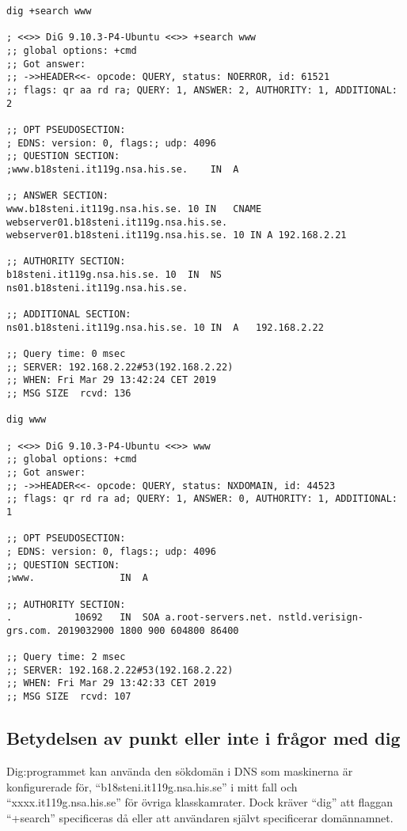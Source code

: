 \documentclass[11pt,a4paper]{article}
\begin{document}
\begin{lstlisting}[caption={Några frågor, 'dig -t A www' med eller utan '+search'}]
dig +search www

; <<>> DiG 9.10.3-P4-Ubuntu <<>> +search www
;; global options: +cmd
;; Got answer:
;; ->>HEADER<<- opcode: QUERY, status: NOERROR, id: 61521
;; flags: qr aa rd ra; QUERY: 1, ANSWER: 2, AUTHORITY: 1, ADDITIONAL: 2

;; OPT PSEUDOSECTION:
; EDNS: version: 0, flags:; udp: 4096
;; QUESTION SECTION:
;www.b18steni.it119g.nsa.his.se.	IN	A

;; ANSWER SECTION:
www.b18steni.it119g.nsa.his.se.	10 IN	CNAME	webserver01.b18steni.it119g.nsa.his.se.
webserver01.b18steni.it119g.nsa.his.se.	10 IN A	192.168.2.21

;; AUTHORITY SECTION:
b18steni.it119g.nsa.his.se. 10	IN	NS	ns01.b18steni.it119g.nsa.his.se.

;; ADDITIONAL SECTION:
ns01.b18steni.it119g.nsa.his.se. 10 IN	A	192.168.2.22

;; Query time: 0 msec
;; SERVER: 192.168.2.22#53(192.168.2.22)
;; WHEN: Fri Mar 29 13:42:24 CET 2019
;; MSG SIZE  rcvd: 136

dig www

; <<>> DiG 9.10.3-P4-Ubuntu <<>> www
;; global options: +cmd
;; Got answer:
;; ->>HEADER<<- opcode: QUERY, status: NXDOMAIN, id: 44523
;; flags: qr rd ra ad; QUERY: 1, ANSWER: 0, AUTHORITY: 1, ADDITIONAL: 1

;; OPT PSEUDOSECTION:
; EDNS: version: 0, flags:; udp: 4096
;; QUESTION SECTION:
;www.				IN	A

;; AUTHORITY SECTION:
.			10692	IN	SOA	a.root-servers.net. nstld.verisign-grs.com. 2019032900 1800 900 604800 86400

;; Query time: 2 msec
;; SERVER: 192.168.2.22#53(192.168.2.22)
;; WHEN: Fri Mar 29 13:42:33 CET 2019
;; MSG SIZE  rcvd: 107
\end{lstlisting}

\newpage
\subsection{Betydelsen av punkt eller inte i frågor med dig}

Dig:programmet kan använda den sökdomän i DNS som maskinerna är konfigurerade för, ``b18steni.it119g.nsa.his.se'' i mitt fall och ``xxxx.it119g.nsa.his.se''
för övriga klasskamrater.
Dock kräver ``dig'' att flaggan ``+search'' specificeras då eller att användaren självt specificerar domännamnet.
\end{document}
